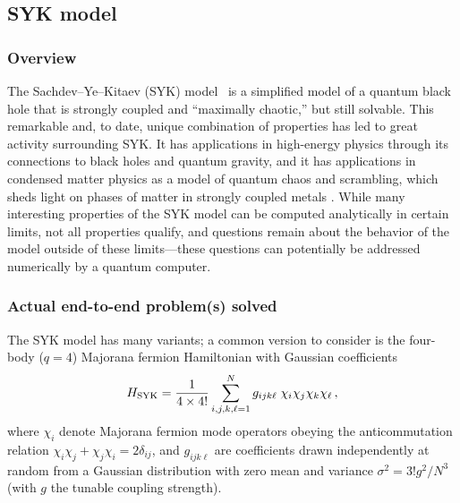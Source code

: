 \begin{refsection}


\printbibliography[heading=secbib,segment=\therefsegment]





\end{refsection}








\newpage
\begin{refsection}

\subsection{SYK model}\label{appl:SYK}


\subsubsection*{Overview}

The Sachdev--Ye--Kitaev (SYK) model~\cite{sachdev1993_sy_model,kitaev2015_syk} 
is a simplified model of a quantum black hole that is  strongly coupled and ``maximally chaotic,'' but still solvable. This remarkable and, to date, unique combination of properties has led to great activity surrounding SYK. It has applications in high-energy physics through its connections to black holes and quantum gravity, and it has applications in condensed matter physics as a model of quantum chaos and scrambling, which sheds light on phases of matter in strongly coupled metals \cite{rosenhaus2019SYK,song2017stronglyCorrelatedMetalSYK}. 
While many interesting properties of the SYK model can be computed analytically in certain limits, not all properties qualify, and questions remain about the behavior of the model outside of these limits---these questions can potentially be addressed numerically by a quantum computer. 

\subsubsection*{Actual end-to-end problem(s) solved}
The SYK model has many variants; a common version to consider is the four-body ($q=4$) Majorana fermion Hamiltonian with Gaussian coefficients
\begin{align}
    H_{\rm SYK} = \frac{1}{4\times 4!}\sum_{i,j,k,\ell=1}^N g_{ijk\ell} \; \chi_i\chi_j \chi_k \chi_{\ell} \,,
\end{align}
where $\chi_i$ denote Majorana fermion mode operators obeying the anticommutation relation $\chi_i\chi_j+\chi_j\chi_i = 2\delta_{ij}$, and $g_{ijk\ell}$ are coefficients drawn independently at random from a Gaussian distribution with zero mean and variance $\sigma^2 = 3!g^2/N^3$ (with $g$ the tunable coupling strength).


\end{refsection}
